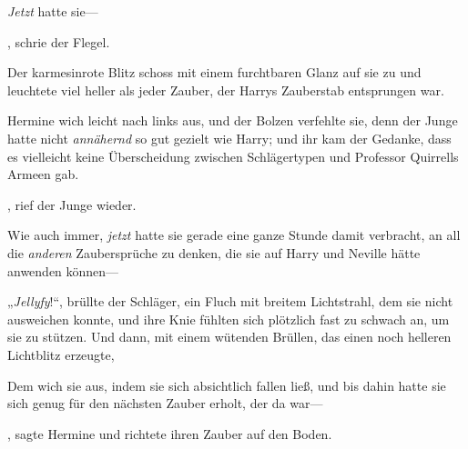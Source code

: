 \emph{Jetzt} hatte sie—

, schrie der Flegel.

Der karmesinrote Blitz schoss mit einem furchtbaren Glanz auf sie zu und leuchtete viel heller als jeder Zauber, der Harrys Zauberstab entsprungen war.

Hermine wich leicht nach links aus, und der Bolzen verfehlte sie, denn der Junge hatte nicht \emph{annähernd} so gut gezielt wie Harry; und ihr kam der Gedanke, dass es vielleicht keine Überscheidung zwischen Schlägertypen und Professor Quirrells Armeen gab.

, rief der Junge wieder. 

Wie auch immer, \emph{jetzt} hatte sie gerade eine ganze Stunde damit verbracht, an all die \emph{anderen} Zaubersprüche zu denken, die sie auf Harry und Neville hätte anwenden können—

„\emph{Jellyfy}!“, brüllte der Schläger, ein Fluch mit breitem Lichtstrahl, dem sie nicht ausweichen konnte, und ihre Knie fühlten sich plötzlich fast zu schwach an, um sie zu stützen. Und dann, mit einem wütenden Brüllen, das einen noch helleren Lichtblitz erzeugte, 

Dem wich sie aus, indem sie sich absichtlich fallen ließ, und bis dahin hatte sie sich genug für den nächsten Zauber erholt, der da war—

, sagte Hermine und richtete ihren Zauber auf den Boden.

